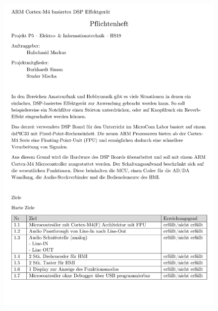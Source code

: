 \begin{appendix}
\begin{figure}[h!]
	\centering
	\includegraphics[width=0.95\linewidth]{appendix/pflichtenheft(1).pdf}
\end{figure}


\end{appendix}
